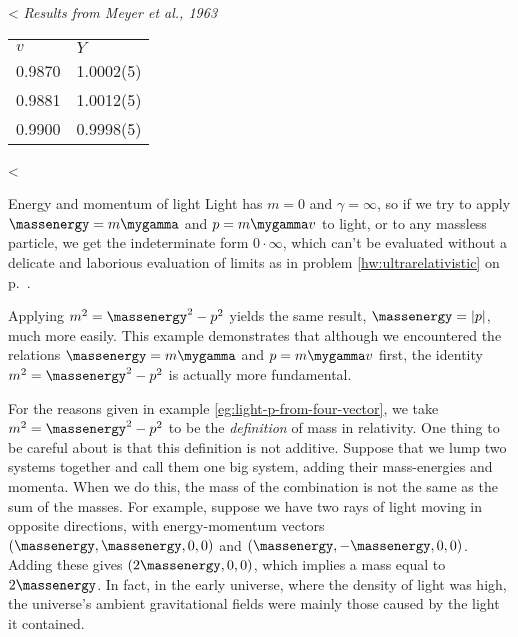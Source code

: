 <%
\noindent\emph{Results from Meyer et al., 1963}

\begin{tabular}{ll}
  $v$ & $Y$ \\
  0.9870 & 1.0002(5) \\
  0.9881 & 1.0012(5) \\
  0.9900 & 0.9998(5)
\end{tabular}
<%

\begin{eg}{Energy and momentum of light}\label{eg:light-p-from-four-vector}
Light has $m=0$ and $\gamma=\infty$, so if we try to apply $\massenergy=m\mygamma$ and $p=m\mygamma v$ to light,
or to any massless particle, we get the indeterminate form $0\cdot\infty$, which can't be evaluated without
a delicate and laborious evaluation of limits as in problem \ref{hw:ultrarelativistic}
on p.~\pageref{hw:ultrarelativistic}.

Applying $m^2 = \massenergy^2 - p^2$ yields the same result, $\massenergy=|p|$, much more easily. This example
demonstrates that although we encountered the relations $\massenergy=m\mygamma$ and $p=m\mygamma v$ first,
the identity $m^2 = \massenergy^2 - p^2$ is actually more fundamental.
\end{eg}

For the reasons given in example \ref{eg:light-p-from-four-vector}, we take
$m^2 = \massenergy^2 - p^2$ to be the \emph{definition} of mass in relativity.
One thing to be careful about is that this definition is not additive. Suppose that we lump
two systems together and call them one big system, adding their mass-energies and momenta.
When we do this, the mass of the combination is not the same as  the sum of the masses.
For example, suppose we have two rays of light moving in opposite directions, with
energy-momentum vectors $(\massenergy,\massenergy,0,0)$ and $(\massenergy,-\massenergy,0,0)$.
Adding these gives $(2\massenergy,0,0)$, which implies a mass equal to $2\massenergy$. In
fact, in the early universe, where the density of light was high, the universe's ambient
gravitational fields were mainly those caused by the light it contained.

